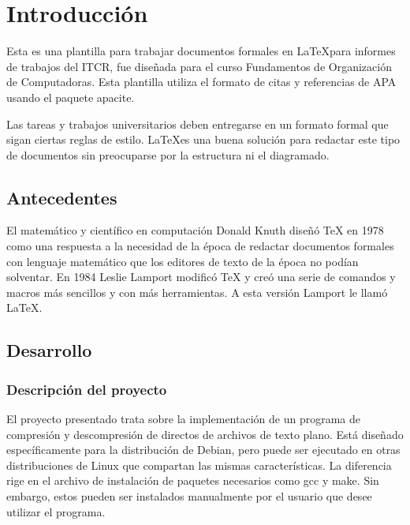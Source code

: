 \documentclass{report}
\begin{document}


\tableofcontents

\chapter{Introducción}\label{intro}

Esta es una plantilla para trabajar documentos formales en \LaTeX para informes de trabajos del ITCR, fue diseñada para el curso Fundamentos de Organización de Computadoras.
Esta plantilla utiliza el formato de citas y referencias de APA usando el paquete apacite.

Las tareas y trabajos universitarios deben entregarse en un formato formal que sigan ciertas reglas de estilo. 
\LaTeX es una buena solución para redactar este tipo de documentos sin preocuparse por la estructura ni el diagramado.

\section{Antecedentes}\label{antecedentes}

El matemático y científico en computación Donald Knuth diseñó TeX en 1978 como una respuesta a la necesidad de la época de redactar documentos formales con lenguaje matemático que los editores de texto de la época no podían solventar. En 1984 Leslie Lamport modificó TeX y creó una serie de comandos y macros más sencillos y con más herramientas. A esta versión Lamport le llamó \LaTeX \cite{lopez18}.

\section{Desarrollo}

\subsection{Descripción del proyecto}
El proyecto presentado trata sobre la implementación de un programa de compresión y descompresión de directos de archivos de texto plano. Está diseñado específicamente para la distribución de Debian, pero puede ser ejecutado en otras distribuciones de Linux que compartan las mismas características. La diferencia rige en el archivo de instalación de paquetes necesarios como gcc y make. Sin embargo, estos pueden ser instalados manualmente por el usuario que desee utilizar el programa.
\end{document}
